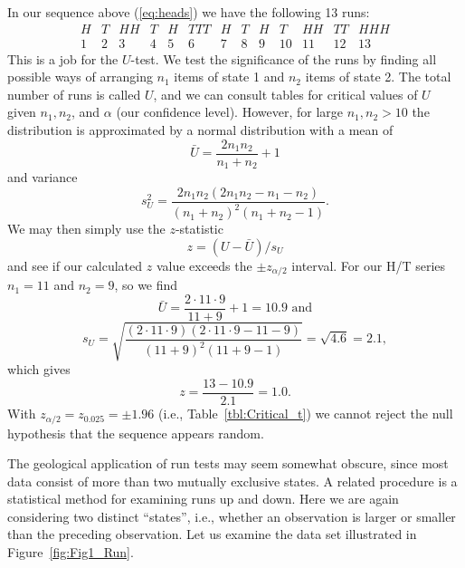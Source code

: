 \begin{example}
In our sequence above (\ref{eq:heads}) we have the following 13 runs:
\begin{equation}
\begin{array}{rrcrrcrrrcccc}
                 H & T & HH &  T &  H &  TTT & H & T &  H &   T &   HH &   TT &   HHH\\
                  1 & 2 &  3 &     4 &   5 &     6 &    7 &   8 &   9 &    10 &  11 &    12 &     13\end{array} 
\end{equation}
This is a job for the $U$-test.
We test the significance of the runs by finding all possible ways of arranging $n_1$ items of state 1 
and $n_2$ items of state 2.  The total number of runs is called $U$, and we can consult tables for critical 
values of $U$ given $n_1, n_2$, and $\alpha$ (our confidence level).  However, for large $n_1, n_2 > 10$  the 
distribution is approximated by a normal distribution with a mean of 
\begin{equation}
\bar{U} = \frac{2n_1 n_2}{n_1 + n_2} + 1
\end{equation}
and variance
\begin{equation}
s^2_U = \frac{2n_1 n_2 (2n_1 n_2- n_1 - n_2)}{(n_1 + n_2)^2 (n_1 + n_2 -1)}.
\end{equation}
We may then simply use the $z$-statistic
\begin{equation}
z = (U - \bar{U})/ s_U
\end{equation}
and see if our calculated $z$ value exceeds the $\pm z_{\alpha/2}$ interval.  For our H/T series
$n_1 = 11$ and $n_2 = 9$, so we find
\begin{equation}
\bar{U} = \frac{2 \cdot 11 \cdot 9}{11 + 9} + 1 = 10.9 \mbox{ and}
\end{equation}
\begin{equation}
s_U = \sqrt{\frac{(2 \cdot 11 \cdot 9)(2 \cdot 11 \cdot 9 - 11 - 9)}{(11 + 9)^2(11+9 -1)}} = \sqrt{4.6} = 2.1,
\end{equation}
which gives
\begin{equation}
z = \frac{13 - 10.9}{2.1} = 1.0.
\end{equation}
With $z_{\alpha/2} = z_{0.025} = \pm 1.96$ (i.e., Table~\ref{tbl:Critical_t}) we cannot reject the null hypothesis that the sequence appears random.
\end{example}

	The geological application of run tests may seem somewhat obscure, since most data 
consist of more than two mutually exclusive states.  A related procedure is a statistical method 
for examining runs up and down.  Here we are again considering two distinct ``states'', i.e., 
whether an observation is larger or smaller than the preceding observation.  Let us examine the 
data set illustrated in Figure~\ref{fig:Fig1_Run}.

